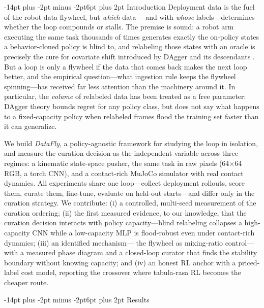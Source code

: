 \documentclass[10pt]{article}
\makeatletter
\renewcommand\section{\@startsection{section}{1}{\z@}%
  {-14pt plus -2pt minus -2pt}{6pt plus 2pt}%
  {\normalfont\bfseries\large}}
\makeatother
\begin{document}
\section{Introduction}
Deployment data is the fuel of the robot data flywheel, but \emph{which} data---
and with \emph{whose} labels---determines whether the loop compounds or stalls.
The premise is sound: a robot arm executing the same task thousands of times
generates exactly the on-policy states a behavior-cloned policy is blind to,
and relabeling those states with an oracle is precisely the cure for
covariate shift introduced by DAgger and its descendants \cite{ross2011reduction,
dart2017noise}. But a loop is only a flywheel if the data that comes back makes
the next loop better, and the empirical question---what ingestion rule keeps the
flywheel spinning---has received far less attention than the machinery around
it. In particular, the \emph{volume} of relabeled data has been treated as a
free parameter: DAgger theory bounds regret for any policy class, but does not
say what happens to a fixed-capacity policy when relabeled frames flood the
training set faster than it can generalize.

We build \emph{DataFly}, a policy-agnostic framework for studying the loop in
isolation, and measure the curation decision as the independent variable across
three regimes: a kinematic state-space pusher, the same task in raw pixels
(64$\times$64 RGB, a torch CNN), and a contact-rich MuJoCo simulator with real
contact dynamics. All experiments share one loop---collect deployment rollouts,
score them, curate them, fine-tune, evaluate on held-out starts---and differ
only in the curation strategy. We contribute: (i) a controlled, multi-seed
measurement of the curation ordering; (ii) the first measured evidence, to our
knowledge, that the curation decision interacts with policy capacity---blind
relabeling collapses a high-capacity CNN while a low-capacity MLP is
flood-robust even under contact-rich dynamics; (iii) an identified mechanism---
the flywheel as mixing-ratio control---with a measured phase diagram and a
closed-loop curator that finds the stability boundary without knowing capacity;
and (iv) an honest RL anchor with a priced-label cost model, reporting the
crossover where tabula-rasa RL becomes the cheaper route.

\section{Results}
\end{document}
